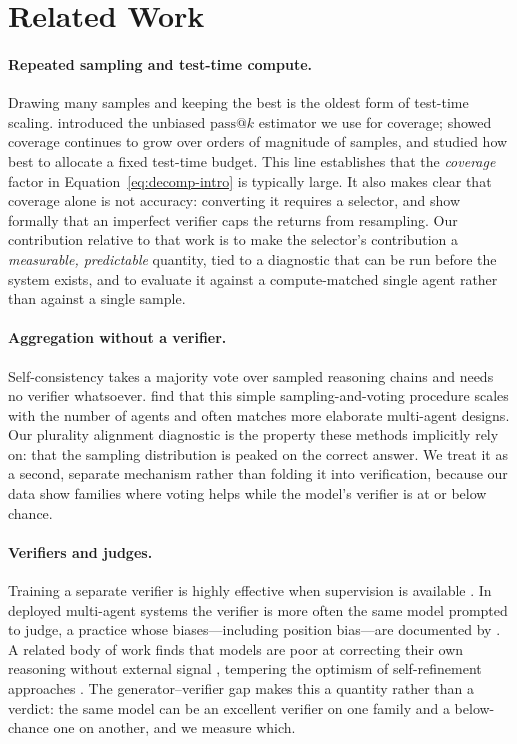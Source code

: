 \section{Related Work}
\label{sec:related}

\paragraph{Repeated sampling and test-time compute.}
Drawing many samples and keeping the best is the oldest form of test-time
scaling. \citet{chen2021codex} introduced the unbiased $\mathrm{pass}@k$
estimator we use for coverage; \citet{brown2024monkeys} showed coverage
continues to grow over orders of magnitude of samples, and
\citet{snell2024scaling} studied how best to allocate a fixed test-time budget.
This line establishes that the \emph{coverage} factor in
Equation~\eqref{eq:decomp-intro} is typically large. It also makes clear that
coverage alone is not accuracy: converting it requires a selector, and
\citet{stroebl2024limits} show formally that an imperfect verifier caps the
returns from resampling. Our contribution relative to that work is to make the
selector's contribution a \emph{measurable, predictable} quantity, tied to a
diagnostic that can be run before the system exists, and to evaluate it against
a compute-matched single agent rather than against a single sample.

\paragraph{Aggregation without a verifier.}
Self-consistency \citep{wang2023selfconsistency} takes a majority vote over
sampled reasoning chains and needs no verifier whatsoever. \citet{li2024moreagents}
find that this simple sampling-and-voting procedure scales with the number of
agents and often matches more elaborate multi-agent designs. Our plurality
alignment diagnostic is the property these methods implicitly rely on: that the
sampling distribution is peaked on the correct answer. We treat it as a second,
separate mechanism rather than folding it into verification, because our data
show families where voting helps while the model's verifier is at or below
chance.

\paragraph{Verifiers and judges.}
Training a separate verifier is highly effective when supervision is available
\citep{cobbe2021gsm8k,lightman2024verify,li2023stepaware}. In deployed
multi-agent systems the verifier is more often the same model prompted to
judge, a practice whose biases---including position bias---are documented by
\citet{zheng2023judge}. A related body of work finds that models are poor at
correcting their own reasoning without external signal
\citep{huang2024cannot,valmeekam2023selfcritique}, tempering the optimism of
self-refinement approaches \citep{madaan2023selfrefine}. The
generator--verifier gap makes this a quantity rather than a verdict: the same
model can be an excellent verifier on one family and a below-chance one on
another, and we measure which.

